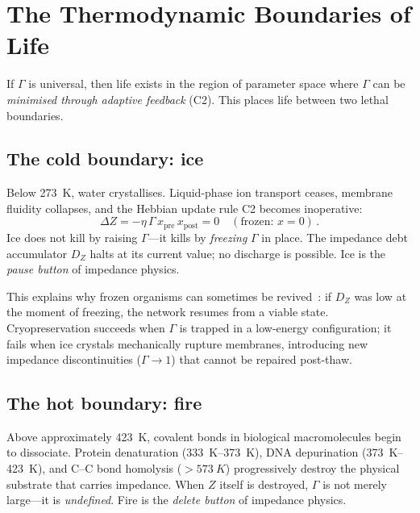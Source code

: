 \documentclass[aps,pre,twocolumn,superscriptaddress,floatfix]{revtex4-2}
\begin{document}
\section{The Thermodynamic Boundaries of Life}
\label{sec:boundaries}

If $\Gamma$ is universal, then life exists in the region of
parameter space where $\Gamma$ can be \emph{minimised through
adaptive feedback} (C2).  This places life between two
lethal boundaries.

\subsection{The cold boundary: ice}

Below \SI{273}{K}, water crystallises.
Liquid-phase ion transport ceases, membrane fluidity
collapses, and the Hebbian update rule C2 becomes
inoperative:
\begin{equation}
  \Delta Z = -\eta\,\Gamma\,x_{\text{pre}}\,x_{\text{post}} = 0
  \quad (\text{frozen: } x = 0)\,.
  \label{eq:frozen}
\end{equation}
Ice does not kill by raising $\Gamma$---it kills by
\emph{freezing} $\Gamma$ in place.
The impedance debt accumulator $D_Z$ halts at its current
value; no discharge is possible.
Ice is the \emph{pause button} of impedance physics.

This explains why frozen organisms can sometimes be
revived~\cite{Scholander1953}: if $D_Z$ was low at the
moment of freezing, the network resumes from a viable state.
Cryopreservation succeeds when $\Gamma$ is trapped in a
low-energy configuration; it fails when ice crystals
mechanically rupture membranes, introducing new impedance
discontinuities ($\Gamma \to 1$) that cannot be repaired
post-thaw.

\subsection{The hot boundary: fire}

Above approximately \SI{423}{K}, covalent bonds in
biological macromolecules begin to dissociate.
Protein denaturation (\SIrange{333}{373}{K}),
DNA depurination (\SIrange{373}{423}{K}),
and C--C bond homolysis ($>\SI{573}{K}$) progressively
destroy the physical substrate that carries impedance.
When $Z$ itself is destroyed, $\Gamma$ is not merely
large---it is \emph{undefined}.
Fire is the \emph{delete button} of impedance physics.
\end{document}
